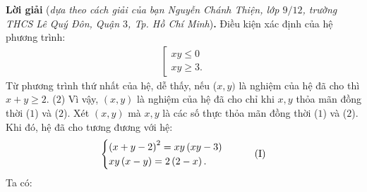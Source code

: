 \begin{multicols}{2}
	\textbf{\color{thachthuctoanhoc}Lời giải} (\textit{dựa theo cách giải của bạn Nguyễn Chánh Thiện, lớp $9/12$, trường THCS Lê Quý Đôn, Quận $3$, Tp. Hồ Chí Minh})\textbf{\color{thachthuctoanhoc}.}
	\vskip 0.05cm
	Điều kiện xác định của hệ phương trình:
	\begin{align*}
		\left[ \begin{array}{l}
			xy \le 0\\
			xy \ge 3.
		\end{array} \right. \tag{$1$}
	\end{align*}
	Từ phương trình thứ nhất của hệ, dễ thấy, nếu ($x, y)$ là nghiệm của hệ đã cho thì \linebreak $x + y \ge  2$.   \hfill  ($2$)
	\vskip 0.05cm
	Vì vậy, $(x, y)$ là nghiệm của hệ đã cho chỉ khi $x, y$ thỏa mãn đồng thời ($1$) và ($2$).
	\vskip 0.05cm
	Xét $(x, y)$ mà $x, y$ là các số thực thỏa mãn đồng thời ($1$) và ($2$).
	\vskip 0.05cm
	Khi đó, hệ đã cho tương đương với hệ:
	\begin{align*}
		\begin{cases}
			{\left( {x + y - 2} \right)^2} = xy\left( {xy - 3} \right)\\
			xy\left( {x - y} \right) = 2\left( {2 - x} \right).
		\end{cases} \tag{$\text{I}$}
	\end{align*}
	Ta có:
	\vskip 0.05cm
\end{multicols}
